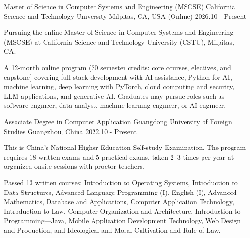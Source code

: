 

\begin{cventries}

  \cventry
    {Master of Science in Computer Systems and Engineering (MSCSE)} %
    {California Science and Technology University} %
    {Milpitas, CA, USA (Online)} %
    {2026.10 - Present} %
    {
      \begin{cvitems} %
        \item {Pursuing the online Master of Science in Computer Systems and Engineering (MSCSE) at California Science and Technology University (CSTU), Milpitas, CA.}
        \item {A 12-month online program (30 semester credits: core courses, electives, and capstone) covering full stack development with AI assistance, Python for AI, machine learning, deep learning with PyTorch, cloud computing and security, LLM applications, and generative AI. Graduates may pursue roles such as software engineer, data analyst, machine learning engineer, or AI engineer.}
      \end{cvitems}
    }
  \cventry
    {Associate Degree in Computer Application} %
    {Guangdong University of Foreign Studies} %
    {Guangzhou, China} %
    {2022.10 - Present} %
    {
      \begin{cvitems} %
        \item {This is China's National Higher Education Self-study Examination. The program requires 18 written exams and 5 practical exams, taken 2--3 times per year at organized onsite sessions with proctor teachers.}
        \item {Passed 13 written courses: Introduction to Operating Systems, Introduction to Data Structures, Advanced Language Programming (I), English (I), Advanced Mathematics, Database and Applications, Computer Application Technology, Introduction to Law, Computer Organization and Architecture, Introduction to Programming---Java, Mobile Application Development Technology, Web Design and Production, and Ideological and Moral Cultivation and Rule of Law.}

\end{cvitems}}
\end{cventries}
